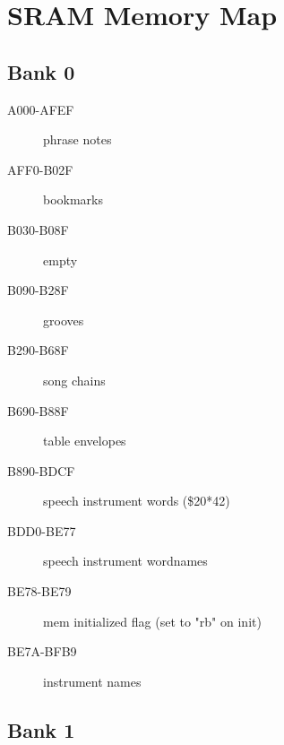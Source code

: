 \chapter{SRAM Memory Map}

\section{Bank 0}

\begin{description}
    \item[A000-AFEF] phrase notes
    \item[AFF0-B02F] bookmarks
    \item[B030-B08F] empty
    \item[B090-B28F] grooves
    \item[B290-B68F] song chains
    \item[B690-B88F] table envelopes
    \item[B890-BDCF] speech instrument words (\$20*42)
    \item[BDD0-BE77] speech instrument wordnames
    \item[BE78-BE79] mem initialized flag (set to "rb" on init)
    \item[BE7A-BFB9] instrument names
\end{description}

\section{Bank 1}


